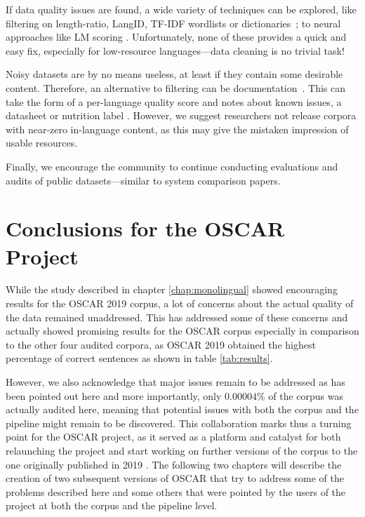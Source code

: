 If data quality issues are found, a wide variety of techniques can be explored, like filtering on length-ratio, LangID, TF-IDF wordlists \cite{caswell-etal-2020-language} or dictionaries~\citep{kamholz-etal-2014-panlex}; to neural approaches like LM scoring \cite{axelrod-etal-2011-domain,moore-lewis-2010-intelligent,wang-etal-2018-denoising}. Unfortunately, none of these provides a quick and easy fix, especially for low-resource languages---data cleaning is no trivial task!

Noisy datasets are by no means useless, at least if they contain some desirable content. Therefore, an alternative to filtering can be documentation~\citep{bender-etal-2021-on}. This can take the form of a per-language quality score and notes about known issues,
a datasheet \citep{gebru-etal-2018-datasheets} or nutrition label \citep{holland-etal-2018-the}. However, we suggest researchers not release corpora with near-zero in-language content, as this may give the mistaken impression of usable resources.

Finally, we encourage the community to continue conducting evaluations and audits of public datasets---similar to system comparison papers.

\section{Conclusions for the OSCAR Project}

While the study described in chapter \ref{chap:monolingual} showed encouraging results for the OSCAR 2019 corpus, a lot of concerns about the actual quality of the data remained unaddressed. This has addressed some of these concerns and actually showed promising results for the OSCAR corpus especially in comparison to the other four audited corpora, as OSCAR 2019 obtained the highest percentage of correct sentences as shown in table \ref{tab:results}.

However, we also acknowledge that major issues remain to be addressed as has been pointed out here and more importantly, only $0.00004\%$ of the corpus was actually audited here, meaning that potential issues with both the corpus and the pipeline might remain to be discovered. This collaboration marks thus a turning point for the OSCAR project, as it served as a platform and catalyst for both relaunching the project and start working on further versions of the corpus to the one originally published in 2019 \citep{ortiz-suarez-etal-2019-asynchronous}. The following two chapters will describe the creation of two subsequent versions of OSCAR that try to address some of the problems described here and some others that were pointed by the users of the project at both the corpus and the pipeline level.

